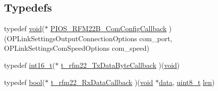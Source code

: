 \subsection*{Typedefs}
\begin{DoxyCompactItemize}
\item 
typedef \hyperlink{group___n_a_m_e_ga18028b8badbf1ea7e704ccac3c488e82}{void}($\ast$ \hyperlink{group___p_i_o_s___r_f_m22_b_gaa8a316480e010f5e383d29257c0686cd}{P\-I\-O\-S\-\_\-\-R\-F\-M22\-B\-\_\-\-Com\-Config\-Callback} )(O\-P\-Link\-Settings\-Output\-Connection\-Options com\-\_\-port, O\-P\-Link\-Settings\-Com\-Speed\-Options com\-\_\-speed)
\item 
typedef \hyperlink{stdint_8h_aa343fa3b3d06292b959ffdd4c4703b06}{int16\-\_\-t}($\ast$ \hyperlink{group___p_i_o_s___r_f_m22_b_ga10adbdf30d2b2a9c6eab132094364df2}{t\-\_\-rfm22\-\_\-\-Tx\-Data\-Byte\-Callback} )(\hyperlink{group___n_a_m_e_ga18028b8badbf1ea7e704ccac3c488e82}{void})
\item 
typedef \hyperlink{group___exported__types_gaf6a258d8f3ee5206d682d799316314b1}{bool}($\ast$ \hyperlink{group___p_i_o_s___r_f_m22_b_ga6d517bc1c96f4b523eb7a289850c3bb8}{t\-\_\-rfm22\-\_\-\-Rx\-Data\-Callback} )(\hyperlink{group___n_a_m_e_ga18028b8badbf1ea7e704ccac3c488e82}{void} $\ast$\hyperlink{pios__opahrs__proto_8h_a20e3f4bfaeccf09a75ef27e095a10112}{data}, \hyperlink{stdint_8h_aba7bc1797add20fe3efdf37ced1182c5}{uint8\-\_\-t} \hyperlink{mavlink__helpers_8h_aba59486c1504340293255a065b546e3a}{len})
\end{DoxyCompactItemize}
